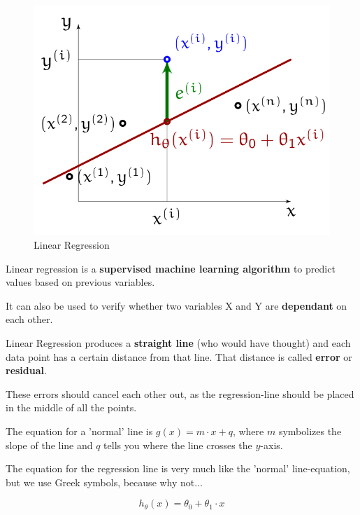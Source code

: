 \documentclass[11pt]{article}
\begin{document}
\begin{figure}
    \centering
    \includegraphics[keepaspectratio=true,height=14\baselineskip]{linear_regression.png}
    \caption{Linear Regression}
    \label{fig:linear_regression}
\end{figure}

Linear regression is a \textbf{supervised machine learning algorithm} to predict values based on previous variables.

It can also be used to verify whether two variables X and Y are \textbf{dependant} on each other.

\vspace{10px}

Linear Regression produces a \textbf{straight line} (who would have thought) and each data point has a certain distance from that line. That distance is called \textbf{error} or \textbf{residual}.

These errors should cancel each other out, as the regression-line should be placed in the middle of all the points.

\vspace{10px}

The equation for a 'normal' line is $g(x) = m \cdot x + q$, where $m$ symbolizes the slope of the line and $q$ tells you where the line crosses the $y$-axis.

The equation for the regression line is very much like the 'normal' line-equation, but we use Greek symbols, because why not...

\begin{equation}
    h_{\theta}(x) = \theta^{}_{0} + \theta^{}_{1} \cdot x
\end{equation}
\end{document}
